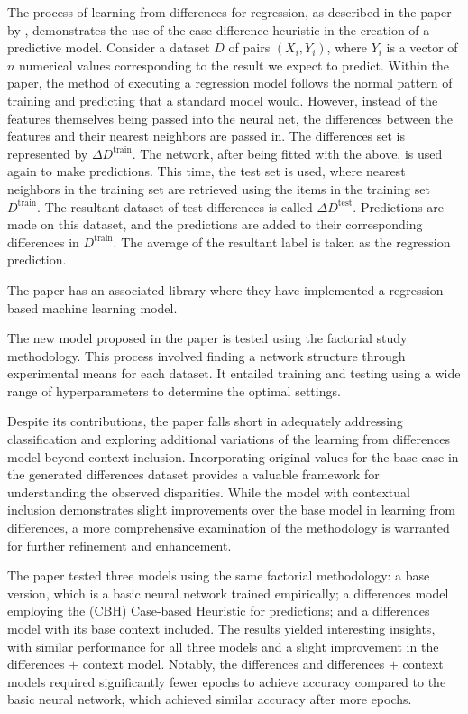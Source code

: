 \documentclass[a4paper, 12pt]{report}
\begin{document}
The process of learning from differences for regression, as described in the paper by \cite{learningFromDifferences2022},
 demonstrates the use of the case difference heuristic in the creation of a predictive model. 
 Consider a dataset $D$ of pairs $(X_i, Y_i)$, where $Y_i$ is a vector of $n$ numerical values corresponding to the result we expect to predict. Within the paper, 
 the method of executing a regression model follows the normal pattern of training and predicting that a standard model would. However, 
 instead of the features themselves being passed into the neural net, 
 the differences between the features and their nearest neighbors are passed in. The differences set is represented by $\Delta D^{\text{train}}$. 
 The network, after being fitted with the above, is used again to make predictions. This time, the test set is used, 
 where nearest neighbors in the training set are retrieved using the items in the training set $D^{\text{train}}$. 
 The resultant dataset of test differences is called $\Delta D^{\text{test}}$. Predictions are made on this dataset, 
 and the predictions are added to their corresponding differences in $D^{\text{train}}$. 
 The average of the resultant label is taken as the regression prediction.

The paper \cite{learningFromDifferences2022} has an associated library where they have implemented a regression-based machine learning model.

The new model proposed in the paper is tested using the factorial study methodology. 
This process involved finding a network structure through experimental means for each dataset. 
It entailed training and testing using a wide range of hyperparameters to determine the optimal settings.

Despite its contributions, the paper falls short in adequately addressing classification and exploring additional variations of the learning from differences model beyond context inclusion. 
Incorporating original values for the base case in the generated differences dataset provides a valuable framework for understanding the observed disparities. 
While the model with contextual inclusion demonstrates slight improvements over the base model in learning from differences, a more comprehensive examination of the methodology 
is warranted for further refinement and enhancement.

The paper tested three models using the same factorial methodology: a base version, which is a basic neural network trained empirically; 
a differences model employing the (CBH) Case-based Heuristic for predictions; and a differences model with its base context included. The results yielded interesting insights, 
with similar performance for all three models and a slight improvement in the differences $+$ context model. 
Notably, the differences and differences $+$ context models required significantly fewer epochs to achieve accuracy compared to the basic neural network, 
which achieved similar accuracy after more epochs.
\end{document}
